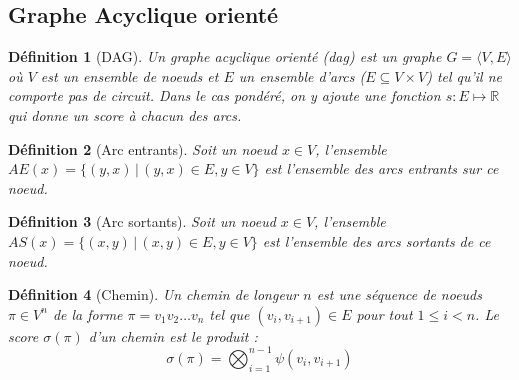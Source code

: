 \documentclass[11pt,openany]{book}
\newtheorem{definition}{Définition}[chapter]
\newcommand{\ac}[1]{{\sc #1}} %
\begin{document}
\begin{center}
\end{center}



\subsection{Graphe Acyclique orienté}

\begin{definition}[DAG] 
Un graphe acyclique orienté (\ac{dag}) est un graphe $G = \langle V,E \rangle$ où $V$ est un ensemble de noeuds et $E$ un ensemble d'arcs
($E \subseteq V\times V$) tel qu'il ne comporte pas de circuit.
Dans le cas pondéré, on  y ajoute une fonction $s: E \mapsto \mathbb{R}$
qui donne un score à chacun des arcs.
\end{definition}

\begin{definition}[Arc entrants] 
Soit un noeud $x\in V$, l'ensemble $AE(x) = \{(y,x) \,|\, (y,x) \in E , y \in V \}$ est l'ensemble des arcs entrants sur ce noeud. 
\end{definition}

\begin{definition}[Arc sortants] 
Soit un noeud $x\in V$, l'ensemble $AS(x) = \{(x,y) \,|\, (x,y) \in E , y \in V \}$ est l'ensemble des arcs sortants de ce noeud. 
\end{definition}

\begin{definition}[Chemin]
Un chemin de longeur $n$ est une séquence de noeuds $\pi \in V^n$ de la forme $\pi = v_1 v_2\ldots v_n$ tel que $(v_i,v_{i+1}) \in E$ pour tout $1\leq i < n$. Le score $\sigma(\pi)$ d'un chemin est le produit :
\begin{displaymath}
\sigma(\pi) = \bigotimes_{i=1}^{n-1} \psi(v_i,v_{i+1}) 
\end{displaymath}
\end{definition}
\end{document}
